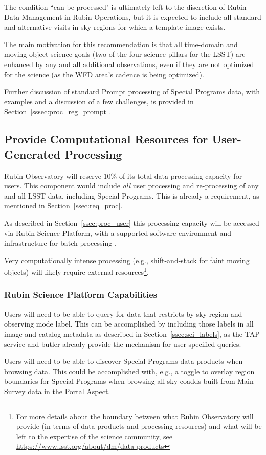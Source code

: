 The condition ``can be processed" is ultimately left to the discretion of
Rubin Data Management in Rubin Operations, but it is expected to include
all standard and alternative visits in sky regions for which a template image exists.

The main motivation for this recommendation is that all time-domain and 
moving-object science goals (two of the four science pillars for the LSST) are
enhanced by any and all additional observations, even if they are not
optimized for the science (as the WFD area's cadence is being optimized).

Further discussion of standard Prompt processing of Special Programs data, with
examples and a discussion of a few challenges,
is provided in Section~\ref{sssec:proc_reg_prompt}.

\subsection{Provide Computational Resources for User-Generated Processing}\label{ssec:sci_comp}

Rubin Observatory will reserve 10\% of its total data processing capacity for users.
This component would include {\it all} user processing and re-processing of any and 
all LSST data, including Special Programs. 
This is already a requirement, as mentioned in Section~\ref{ssec:req_proc}.

As described in Section~\ref{ssec:proc_user} this processing capacity will be 
accessed via Rubin Science Platform, with a supported software environment and 
infrastructure for batch processing .

Very computationally intense processing (e.g., shift-and-stack for faint moving 
objects) will likely require external resources\footnote{For more details about 
the boundary between what Rubin Observatory will provide (in terms of data products 
and processing resources) and what will be left to the expertise of the science community, 
see \url{https://www.lsst.org/about/dm/data-products}}.

\subsubsection{Rubin Science Platform Capabilities}\label{sssec:sci_rsp}

Users will need to be able to query for data that restricts by sky region and 
observing mode label. 
This can be accomplished by including those labels in all image and catalog 
metadata as described in Section~\ref{ssec:sci_labels}, as the TAP service 
and butler already provide the mechanism for user-specified queries.

Users will need to be able to discover Special Programs data products when 
browsing data.
This could be accomplished with, e.g., a toggle to overlay region boundaries
for Special Programs when browsing all-sky coadds built from Main Survey data
in the Portal Aspect.


